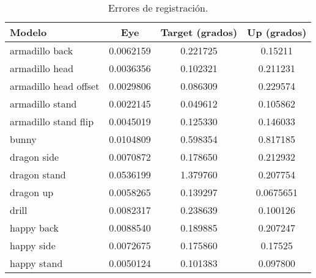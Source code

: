 \begin{table}
	\centering
	\begin{tabular}{l*{3}{c}}
		\toprule
		Modelo                   &    Eye          &    Target (grados)        &    Up (grados)\\
		\midrule
		armadillo back          &     0.0062159   &   0.221725     &    0.15211\\
		armadillo head          &     0.0036356  &    0.102321     &    0.211231\\
		armadillo head offset   &     0.0029806  &    0.086309     &    0.229574\\
		armadillo stand         &     0.0022145  &    0.049612     &    0.105862\\
		armadillo stand flip    &     0.0045019  &    0.125330     &    0.146033\\
		\midrule
		bunny                   &     0.0104809   &   0.598354     &    0.817185\\
		\midrule
		dragon side             &     0.0070872  &    0.178650     &    0.212932\\
		dragon stand            &     0.0536199   &   1.379760     &    0.207754\\
		dragon up               &     0.0058265  &    0.139297     &    0.0675651\\
		\midrule
		drill                   &     0.0082317  &    0.238639     &    0.100126\\
		\midrule
		happy back              &     0.0088540  &    0.189885     &    0.207247\\
		happy side              &     0.0072675   &   0.175860     &    0.17525\\
		happy stand             &     0.0050124  &    0.101383     &    0.097800\\
		\bottomrule
	\end{tabular}
	\caption[Errores de registración]{\label{tab:reg_error}Errores de registración.}
\end{table}
